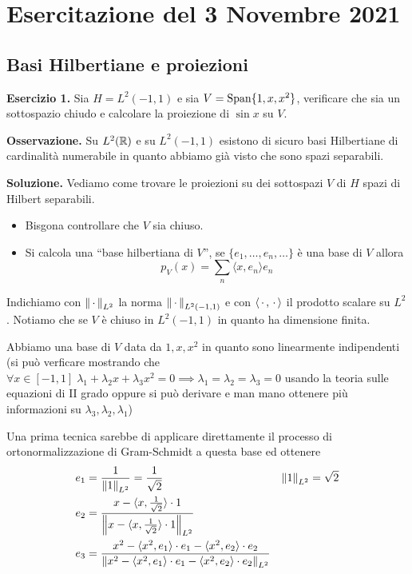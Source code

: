%
%

\section{Esercitazione del 3 Novembre 2021}

\subsection{Basi Hilbertiane e proiezioni}

\textbf{Esercizio 1.}
Sia $H = L^2(-1, 1)$ e sia $V = \operatorname{Span}\{ 1, x, x^2 \}$, verificare che sia un sottospazio chiudo e calcolare la proiezione di $\sin x$ su $V$.

\textbf{Osservazione.}
Su $L^2(\mathbb R)$ e su $L^2(-1, 1)$ esistono di sicuro basi Hilbertiane di cardinalità numerabile in quanto abbiamo già visto che sono spazi separabili.

\textbf{Soluzione.}
Vediamo come trovare le proiezioni su dei sottospazi $V$ di $H$ spazi di Hilbert separabili.

\begin{itemize}
	\item Bisgona controllare che $V$ sia chiuso.

	\item Si calcola una ``base hilbertiana di $V$'', se $\{ e_1, \dots, e_n, \dots \}$ è una base di $V$ allora 
		$$
		p_V(x) = \sum_n \langle x, e_n \rangle e_n
		$$

\end{itemize}

Indichiamo con $\left\lVert \,\cdot\, \right\rVert_{L^2}$ la norma $\left\lVert \,\cdot\, \right\rVert_{L^2(-1, 1)}$ e con $\langle \,\cdot\,, \,\cdot\, \rangle$ il prodotto scalare su $L^2$. Notiamo che se $V$ è chiuso in $L^2(-1, 1)$ in quanto ha dimensione finita. 

Abbiamo una base di $V$ data da $1, x, x^2$ in quanto sono linearmente indipendenti (si può verficare mostrando che $\forall x \in [-1, 1] \; \lambda_1 + \lambda_2 x + \lambda_3 x^2 = 0 \implies \lambda_1 = \lambda_2 = \lambda_3 = 0$ usando la teoria sulle equazioni di II grado oppure si può derivare e man mano ottenere più informazioni su $\lambda_3, \lambda_2, \lambda_1$)

Una prima tecnica sarebbe di applicare direttamente il processo di ortonormalizzazione di Gram-Schmidt a questa base ed ottenere
$$
\begin{aligned}
	e_1 &= \frac{1}{\left\lVert 1 \right\rVert_{L^2}} = \frac{1}{\sqrt{2}}
	&\left\lVert 1 \right\rVert_{L^2} = \sqrt{2} \\
	e_2 &= \frac{x - \langle x, \frac{1}{\sqrt 2} \rangle \cdot 1}{\left\lVert x - \langle x, \frac{1}{\sqrt 2} \rangle \cdot 1 \right\rVert_{L^2}} \\
	e_3 &= \frac{x^2 - \langle x^2, e_1 \rangle \cdot e_1 - \langle x^2, e_2 \rangle \cdot e_2}{\left\lVert x^2 - \langle x^2, e_1 \rangle \cdot e_1 - \langle x^2, e_2 \rangle \cdot e_2 \right\rVert_{L^2}} \\
\end{aligned}
$$

